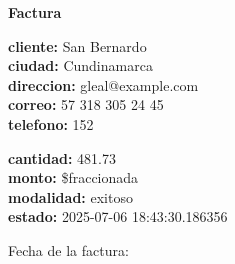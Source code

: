 \documentclass{article}
\begin{document}
\begin{center}
    {\LARGE \textbf{Factura}}\\[1cm]
\end{center}

\textbf{cliente:} San Bernardo \\
\textbf{ciudad:} Cundinamarca \\
\textbf{direccion:} gleal@example.com \\
\textbf{correo:} 57 318 305 24 45 \\
\textbf{telefono:} 152 \\

\vspace{0.5cm}

\textbf{cantidad:} 481.73 \\
\textbf{monto:} \$fraccionada \\
\textbf{modalidad:} exitoso \\
\textbf{estado:} 2025-07-06 18:43:30.186356 \\

\vspace{1cm}

Fecha de la factura: 
\end{document}

